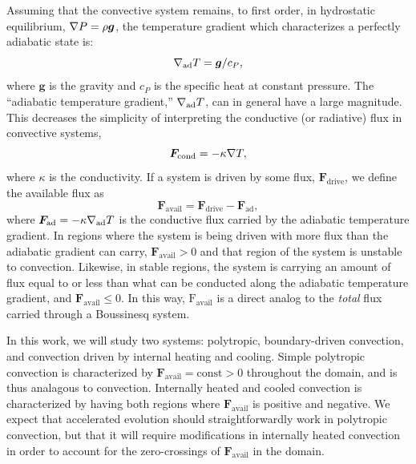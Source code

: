 Assuming that the convective system remains, to first order, in hydrostatic equilibrium, $\nabla P = \rho \bm{g}$, the temperature gradient which characterizes a perfectly adiabatic state is:
\begin{equation}
\nabla_{\text{ad}} T = \bm{g}/c_P,
\end{equation}
where $\bm{g}$ is the gravity and $c_P$ is the specific heat at constant pressure.
The ``adiabatic temperature gradient,'' $\nabla_{\text{ad}} T$, can in general have a large magnitude.
This decreases the simplicity of interpreting the conductive (or radiative) flux in convective systems,
\begin{equation}
\bm{F}_{\text{cond}} = -\kappa \nabla T,
\end{equation}
where $\kappa$ is the conductivity.
If a system is driven by some flux, $\bm{F}_{\text{drive}}$, we define the available flux as
\begin{equation}
\bm{F}_{\text{avail}} = \bm{F}_{\text{drive}} - \bm{F}_{\text{ad}},
\end{equation}
where $\bm{F}_{\text{ad}} = -\kappa\nabla_{\text{ad}} T$ is the conductive flux carried by the adiabatic temperature gradient.
In regions where the system is being driven with more flux than the adiabatic gradient can carry, $\bm{F}_{\text{avail}} > 0$ and that region of the system is unstable to convection.
Likewise, in stable regions, the system is carrying an amount of flux equal to or less than what can be conducted along the adiabatic temperature gradient, and $\bm{F}_{\text{avail}} \leq 0$.
In this way, $\text{F}_{\text{avail}}$ is a direct analog to the \emph{total} flux carried through a Boussinesq system.

In this work, we will study two systems: polytropic, boundary-driven convection, and convection driven by internal heating and cooling.
Simple polytropic convection is characterized by $\bm{F}_{\text{avail}} = \text{const} > 0$ throughout the domain, and is thus analagous to \RB convection.
Internally heated and cooled convection is characterized by having both regions where $\bm{F}_{\text{avail}}$ is positive and negative.
We expect that accelerated evolution should straightforwardly work in polytropic convection, but that it will require modifications in internally heated convection in order to account for the zero-crossings of $\bm{F}_{\text{avail}}$ in the domain.


